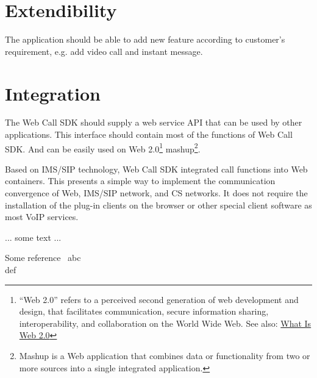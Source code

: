 \section{Extendibility}
\label{sec:Requirement:Extendibility}
The application should be able to add new feature according to customer's requirement, e.g. add video call and instant message.

\section{Integration}
\label{sec:Requirement:Integration}

The Web Call SDK should supply a web service API that can be used by other applications. This interface should contain most of the functions of Web Call SDK. And can be easily used on Web 2.0\footnote{``Web 2.0'' refers to a perceived second generation of web development and design, that facilitates communication, secure information sharing, interoperability, and collaboration on the World Wide Web.\cite{Web2dot0} See also: \href{http://www.oreillynet.com/pub/a/oreilly/tim/news/2005/09/30/what-is-web-20.html}{What Is Web 2.0}\cite{WhatIsWeb2dot0}} mashup\footnote{Mashup is a Web application that combines data or functionality from two or more sources into a single integrated application.}.






Based on IMS/SIP technology, Web Call SDK integrated call functions into Web containers. This presents a simple way to implement the communication convergence of Web, IMS/SIP network, and CS networks. It does not require the installation of the plug-in clients on the browser or other special client software as most VoIP services.




... some text ...

Some reference~
abc\cite{RFC3261}\\
def\cite{RFC3725}


